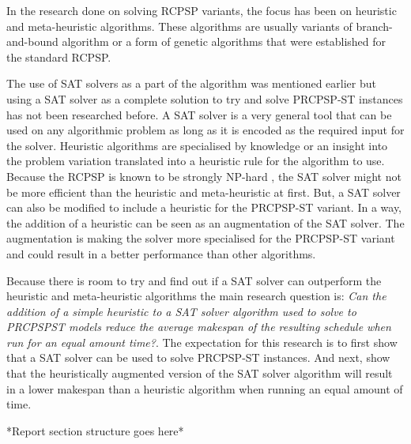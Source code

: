 In the research done on solving RCPSP variants, the focus has been on heuristic and meta-heuristic algorithms. These algorithms are usually variants of branch-and-bound algorithm \cite{RN21} or a form of genetic algorithms \cite{RN28} that were established for the standard RCPSP.

The use of SAT solvers as a part of the algorithm was mentioned earlier but using a SAT solver as a complete solution to try and solve PRCPSP-ST instances has not been researched before. A SAT solver is a very general tool that can be used on any algorithmic problem as long as it is encoded as the required input for the solver. Heuristic algorithms are specialised by knowledge or an insight into the problem variation translated into a heuristic rule for the algorithm to use. Because the RCPSP is known to be strongly NP-hard \cite{RN20}, the SAT solver might not be more efficient than the heuristic and meta-heuristic at first. But, a SAT solver can also be modified to include a heuristic for the PRCPSP-ST variant. In a way, the addition of a heuristic can be seen as an augmentation of the SAT solver. The augmentation is making the solver more specialised for the PRCPSP-ST variant and could result in a better performance than other algorithms. 

Because there is room to try and find out if a SAT solver can outperform the heuristic and meta-heuristic algorithms the main research question is: \textit{Can the addition of a simple heuristic to a SAT solver algorithm used to solve to PRCPSPST models reduce the average makespan of the resulting schedule when run for an equal amount time?}. The expectation for this research is to first show that a SAT solver can be used to solve PRCPSP-ST instances. And next, show that the heuristically augmented version of the SAT solver algorithm will result in a lower makespan than a heuristic algorithm when running an equal amount of time.

*Report section structure goes here*